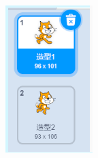 \documentclass[10pt, a4paper]{article}
\begin{document}
\begin{enumerate}
        \begin{figure}[htbp]
            \centering
            \begin{minipage}[t]{.23\textwidth}
                \centering
                \begin{minipage}[t]{.5\textwidth}
                    \centering
                    \includegraphics[width=\textwidth]{8-1.png}
                \end{minipage}
                \begin{minipage}[t]{.3\textwidth}
                    \centering

\end{minipage}
\end{minipage}
\end{figure}
\end{enumerate}
\end{document}
